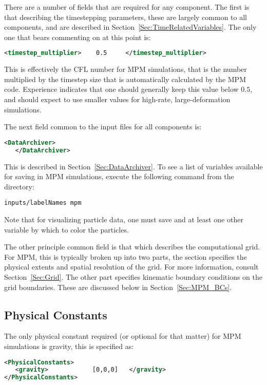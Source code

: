 There are a number of fields that are required for any component.  The first
is that describing the timestepping parameters, these are largely common to
all components, and are described in Section~\ref{Sec:TimeRelatedVariables}.
The only one that bears commenting on at this point is:
\begin{lstlisting}[language=XML]
  <timestep_multiplier>    0.5     </timestep_multiplier>
\end{lstlisting}
This is effectively the CFL number for MPM simulations, that is the number
multiplied by the timestep size that is automatically calculated by the MPM
code.  Experience indicates that one should generally keep this value below
$0.5$, and should expect to use smaller values for high-rate, large-deformation
simulations.

The next field common to the input files for all components is:
\begin{lstlisting}[language=XML]
   <DataArchiver>
   </DataArchiver>
\end{lstlisting}
This is described in Section~\ref{Sec:DataArchiver}.  To see a list of
variables available for saving in MPM simulations, execute the following
command from the  directory:

\begin{lstlisting}[backgroundcolor=\color{background}]
inputs/labelNames mpm
\end{lstlisting}
Note that for visualizing particle data, one must save 
and at least one other variable by which to color the particles.

The other principle common field is that which describes the computational
grid.  For MPM, this is typically broken up into two parts, the
 section specifies the physical extents and spatial
resolution of the grid.  For more information, consult Section~\ref{Sec:Grid}.
The other part specifies kinematic boundary conditions on the grid boundaries.
These are discussed below in Section~\ref{Sec:MPM_BCs}.

\subsection{Physical Constants} \label{Sec:physicalConstants}
The only physical constant required (or optional for that matter) for
MPM simulations is gravity, this is specified as:

\begin{lstlisting}[language=XML]
<PhysicalConstants>
   <gravity>            [0,0,0]   </gravity>
</PhysicalConstants>
\end{lstlisting}

